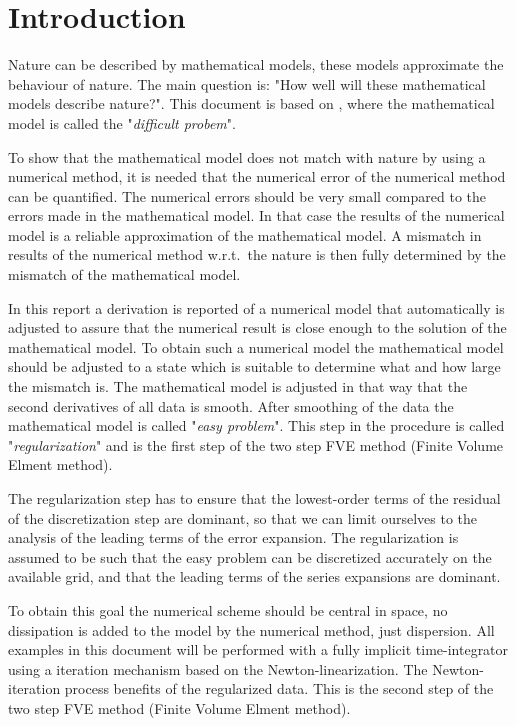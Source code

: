 \chapter{Introduction}\label{sec:introduction}


Nature can be described by mathematical models, these models approximate the behaviour of nature.
The main question is: "How well will these mathematical models describe nature?".
This document is based on \citet{Borsboom1998}, where the mathematical model is called the "\textsl{difficult probem}".

To show that the mathematical model does not match with nature by using a numerical method, it is needed that the numerical error of the numerical method can be quantified.
The numerical errors should be very small compared to the errors made in the mathematical model.
In that case the results of the numerical model is a reliable approximation of the mathematical model.
A mismatch in results of the numerical method w.r.t.\ the nature is then fully determined by the mismatch of the mathematical model.

In this report a derivation is reported of a numerical model that automatically is adjusted to assure that the numerical result is close enough to the solution of the mathematical model.
To obtain such a numerical model the mathematical model should be adjusted to a state which is suitable to determine what and how large the mismatch is.
The mathematical model is adjusted in that way that the second derivatives of all data is smooth.
After smoothing of the data the mathematical model is called "\textsl{easy problem}".
This step in the procedure is called "\textsl{regularization}" and is the first step of the two step FVE method (Finite Volume Elment method).

The regularization step has to ensure that the lowest-order terms of the residual of the discretization step are dominant, so that we can limit ourselves to the analysis of the leading terms of the error expansion.
The regularization is assumed to be such that the easy problem can be discretized accurately on the available grid, and that the leading terms of the series expansions are dominant.

To obtain this goal the numerical scheme should be central in space, no dissipation is added to the model by the numerical method, just dispersion.
All examples in this document will be performed with a fully implicit time-integrator using a iteration mechanism based on the Newton-linearization.
The Newton-iteration process benefits of the regularized data.
This is the second step of the two step FVE method (Finite Volume Elment method).

